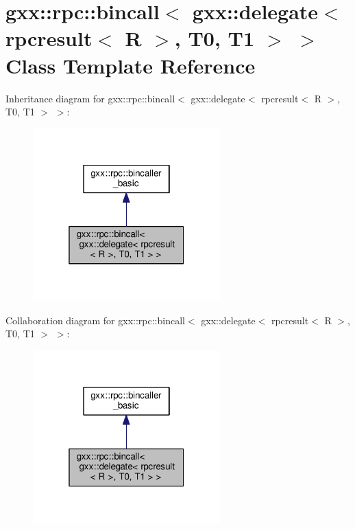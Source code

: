 \hypertarget{classgxx_1_1rpc_1_1bincall_3_01gxx_1_1delegate_3_01rpcresult_3_01R_01_4_00_01T0_00_01T1_01_4_01_4}{}\section{gxx\+:\+:rpc\+:\+:bincall$<$ gxx\+:\+:delegate$<$ rpcresult$<$ R $>$, T0, T1 $>$ $>$ Class Template Reference}
\label{classgxx_1_1rpc_1_1bincall_3_01gxx_1_1delegate_3_01rpcresult_3_01R_01_4_00_01T0_00_01T1_01_4_01_4}


Inheritance diagram for gxx\+:\+:rpc\+:\+:bincall$<$ gxx\+:\+:delegate$<$ rpcresult$<$ R $>$, T0, T1 $>$ $>$\+:
\nopagebreak
\begin{figure}[H]
\begin{center}
\leavevmode
\includegraphics[width=205pt]{classgxx_1_1rpc_1_1bincall_3_01gxx_1_1delegate_3_01rpcresult_3_01R_01_4_00_01T0_00_01T1_01_4_01_4__inherit__graph}
\end{center}
\end{figure}


Collaboration diagram for gxx\+:\+:rpc\+:\+:bincall$<$ gxx\+:\+:delegate$<$ rpcresult$<$ R $>$, T0, T1 $>$ $>$\+:
\nopagebreak
\begin{figure}[H]
\begin{center}
\leavevmode
\includegraphics[width=205pt]{classgxx_1_1rpc_1_1bincall_3_01gxx_1_1delegate_3_01rpcresult_3_01R_01_4_00_01T0_00_01T1_01_4_01_4__coll__graph}
\end{center}
\end{figure}
